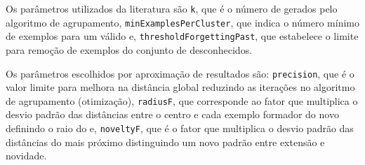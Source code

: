 Os parâmetros utilizados da literatura são
\texttt{k}, que é o número de \mclusters gerados pelo algoritmo de agrupamento,
\texttt{minExamplesPerCluster}, que indica o número mínimo de exemplos para um \mcluster válido
e,
\texttt{thresholdForgettingPast}, que estabelece o limite para remoção de exemplos do conjunto de
desconhecidos.

Os parâmetros escolhidos por aproximação de resultados são:
\texttt{precision}, que é o valor limite para melhora na distância global reduzindo as 
iterações no algoritmo de agrupamento (otimização),
\texttt{radiusF}, que corresponde ao fator que multiplica o desvio padrão das distâncias entre o
centro e cada exemplo formador do novo \mcluster definindo o raio do \mcluster
e,
\texttt{noveltyF}, que é o fator que multiplica o desvio padrão das distâncias do
\mcluster mais próximo distinguindo um novo padrão entre extensão e novidade.






